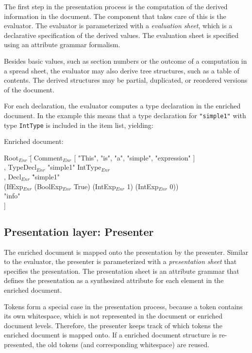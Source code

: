 The first step in the presentation process is the computation of the derived information in the document. The component that takes care of this is the evaluator. The evaluator is parameterized with a {\em evaluation sheet}, which is a declarative specification of the derived values. The evaluation sheet is specified using an attribute grammar formalism.

Besides basic values, such as section numbers or the outcome of a computation in a spread sheet, the evaluator may also derive tree structures, such as a table of contents. The derived structures may be partial, duplicated, or reordered versions of the document.

 For each declaration, the evaluator computes a type declaration in the enriched document. In the example this means that a type declaration for \verb|"simple1"| with type {\tt IntType} is included in the item list, yielding:

Enriched document:
\small \ttfamily
\begin{tabbing}
Root$_{Enr}$ \= [ Comment$_{Enr}$ [ "This", "is", "a", "simple", "expression" ]\\
       \> , TypeDecl$_{Enr}$ "simple1" IntType$_{Enr}$\\
       \> , Decl$_{Enr}$ \= "simple1"\\
       \>                       \> (IfExp$_{Enr}$ (BoolExp$_{Enr}$ True) (IntExp$_{Enr}$ 1) (IntExp$_{Enr}$ 0)) \\
       \>                        \> "info"\\
       \> ] 
\end{tabbing}
\rmfamily \normalsize


%																
\subsection{Presentation layer: Presenter} \label{sect:presenter}

The enriched document is mapped onto the presentation by the presenter. Similar to the evaluator, the presenter is parameterized with a {\em presentation sheet} that specifies the presentation. The presentation sheet is an attribute grammar that defines the presentation as a synthesized attribute for each element in the enriched document.

Tokens form a special case in the presentation process, because a token contains its own whitespace, which is not represented in the document or enriched document levels. Therefore, the presenter keeps track of which tokens the enriched document is mapped onto. If a enriched document structure is re-presented, the old tokens (and corresponding white\-space) are reused. 

